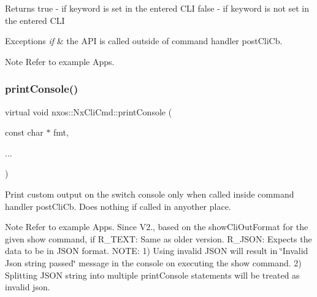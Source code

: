 \begin{DoxyReturn}{Returns}
true -\/ if keyword is set in the entered C\+LI false -\/ if keyword is not set in the entered C\+LI
\end{DoxyReturn}

\begin{DoxyExceptions}{Exceptions}
{\em if} & the A\+PI is called outside of command handler post\+Cli\+Cb. \\
\hline
\end{DoxyExceptions}
\begin{DoxyNote}{Note}
Refer to example Apps. 
\end{DoxyNote}
\mbox{\label{classnxos_1_1_nx_cli_cmd_a10c723c79d75ac2c85821b5ca6540c62}} 
\subsubsection{\texorpdfstring{print\+Console()}{printConsole()}}
{\footnotesize\ttfamily virtual void nxos\+::\+Nx\+Cli\+Cmd\+::print\+Console (\begin{DoxyParamCaption}\item[{const char $\ast$}]{fmt,  }\item[{}]{... }\end{DoxyParamCaption})\hspace{0.3cm}{\ttfamily [pure virtual]}}

Print custom output on the switch console only when called inside command handler post\+Cli\+Cb. Does nothing if called in anyother place.

\begin{DoxyNote}{Note}
Refer to example Apps. Since V2., based on the show\+Cli\+Out\+Format for the given show command, if R\+\_\+\+T\+E\+XT\+: Same as older version. R\+\_\+\+J\+S\+ON\+: Expects the data to be in J\+S\+ON format. N\+O\+TE\+: 1) Using invalid J\+S\+ON will result in \char`\"{}\+Invalid Json string passed\char`\"{} message in the console on executing the show command. 2) Splitting J\+S\+ON string into multiple print\+Console statements will be treated as invalid json.
\end{DoxyNote}

